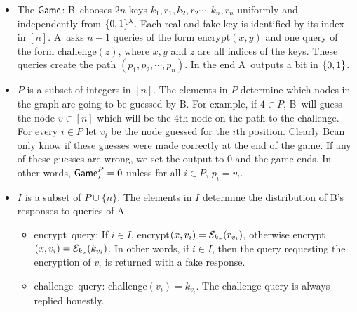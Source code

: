 \documentclass{article}
\def\B{{\sf B}}
\def\A{{\sf A}}
\def\E{{\cal E}}
\newcommand{\encrypt}{{\sf encrypt}}
\newcommand{\game}{{\sf Game}}
\newcommand{\dgg}[2]{\game_{#1}^{#2}}
\def\challenge{{\sf challenge}}
\begin{document}
\begin{itemize}
\item The $\game$: \B~chooses $2n$ keys $k_1,r_1,k_2,r_2\cdots,k_n,r_n$ uniformly and independently from $\{0,1\}^\lambda$. Each real and fake key is identified by its index in $[n]$. \A~asks $n-1$ queries of the form \encrypt$(x,y)$ and one query of the form \challenge$(z)$, where $x,y$ and $z$ are all indices of the keys. These queries create the path $(p_1,p_2,\cdots, p_n)$. In the end \A~outputs a bit in $\{0,1\}$.
 
\item $P$ is a subset of integers in $[n]$. The elements in $P$ determine which nodes in the graph are going to be guessed by \B.   For example, if $4\in P$, \B~will guess the node $v\in [n]$  which will be the 4th node on the path to the challenge. For every $i \in P$ let $v_i$ be the node guessed for the $i$th position. Clearly \B can only know if these guesses were made correctly at the end of the game. If any of these guesses are wrong, we set the output to $0$ and the game ends. In other words, $\dgg{I}{P}=0$ unless for all $i\in P$, $p_i=v_i$.

\item $I$ is a subset of $P\cup \{n\}$. The elements in $I$ determine the distribution of \B's responses to queries of \A.
\begin{itemize}
\item \encrypt~query: If $i\in I$, \encrypt$(x,v_i)=\E_{k_x}(r_{v_i})$, otherwise \encrypt$(x,v_i)=\E_{k_x}(k_{v_i})$. In other words, if $i\in I$, then the query requesting the encryption of $v_i$ is returned with a fake response.
\item \challenge~query: \challenge$(v_i)=k_{v_i}$. The challenge query is always replied honestly. 
\end{itemize}
\end{itemize}
\end{document}
